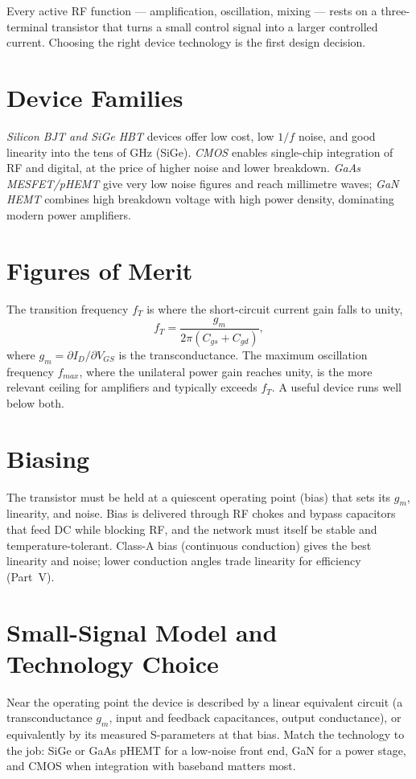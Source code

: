 Every active RF function --- amplification, oscillation, mixing --- rests on a
three-terminal transistor that turns a small control signal into a larger
controlled current. Choosing the right device technology is the first design
decision.

\section{Device Families}
\emph{Silicon BJT and SiGe HBT} devices offer low cost, low $1/f$ noise, and good
linearity into the tens of GHz (SiGe). \emph{CMOS} enables single-chip integration
of RF and digital, at the price of higher noise and lower breakdown. \emph{GaAs
MESFET/pHEMT} give very low noise figures and reach millimetre waves; \emph{GaN
HEMT} combines high breakdown voltage with high power density, dominating modern
power amplifiers.

\section{Figures of Merit}
The transition frequency $f_T$ is where the short-circuit current gain falls to
unity,
\[ f_T = \frac{g_m}{2\pi(C_{gs}+C_{gd})}, \]
where $g_m = \partial I_D/\partial V_{GS}$ is the transconductance. The maximum
oscillation frequency $f_{max}$, where the unilateral power gain reaches unity, is
the more relevant ceiling for amplifiers and typically exceeds $f_T$. A useful
device runs well below both.

\section{Biasing}
The transistor must be held at a quiescent operating point (bias) that sets its
$g_m$, linearity, and noise. Bias is delivered through RF chokes and bypass
capacitors that feed DC while blocking RF, and the network must itself be stable
and temperature-tolerant. Class-A bias (continuous conduction) gives the best
linearity and noise; lower conduction angles trade linearity for efficiency
(Part~V).

\section{Small-Signal Model and Technology Choice}
Near the operating point the device is described by a linear equivalent circuit
(a transconductance $g_m$, input and feedback capacitances, output conductance),
or equivalently by its measured S-parameters at that bias. Match the technology to
the job: SiGe or GaAs pHEMT for a low-noise front end, GaN for a power stage, and
CMOS when integration with baseband matters most.
